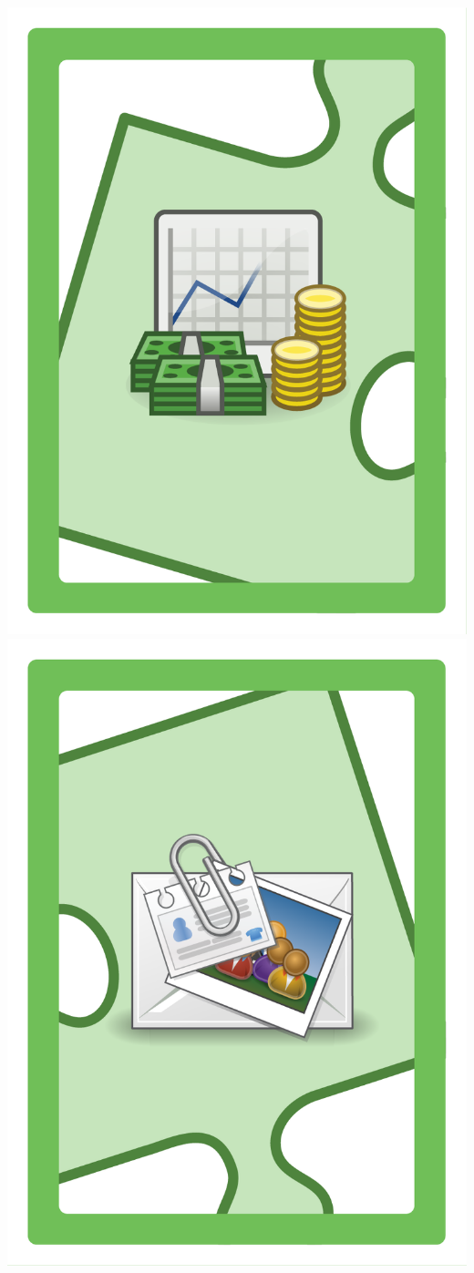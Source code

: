 \documentclass{letter}
\begin{document}
\includegraphics{lo0t/lo0t.shares_financial}
\includegraphics{lo0t/lo0t.shares_pii}
\end{document}
